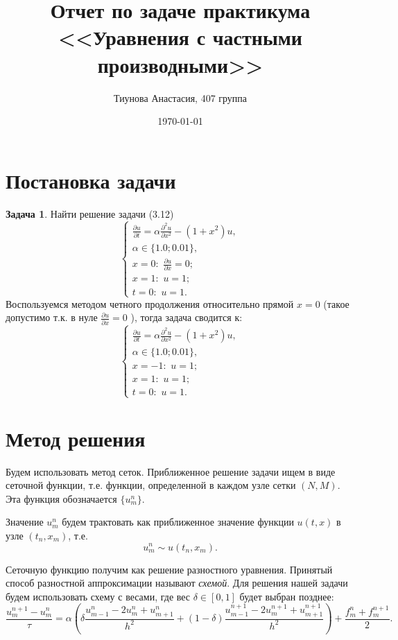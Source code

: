 \documentclass{article}
\title{Отчет по задаче практикума \\ <<Уравнения с частными производными>>}
\date{\today}
\author{Тиунова Анастасия, 407 группа}
\theoremstyle{remark}
\theoremstyle{definition}
\newtheorem*{problem}{Задача}
\begin{document}
	\maketitle
	
	\section{Постановка задачи}
 	\begin{problem} \label{1}
Найти решение задачи (3.12)
$$
\begin{cases}
   \frac{\partial u}{\partial t} =\alpha \frac{\partial^2 u}{\partial x^2} - \left(1+x^2\right)u, \\
   \alpha \in \{1.0; 0.01\},\\
   x=0:\,\,\frac{\partial u}{\partial x}=0;\\
   x=1:\,\, u=1;\\
   t=0:\,\, u=1.
 \end{cases} $$
Воспользуемся методом четного продолжения относительно прямой $x=0$ (такое допустимо т.к. в нуле $\frac{\partial u}{\partial x}=0$ ), тогда задача сводится к:
$$
\begin{cases}
   \frac{\partial u}{\partial t} =\alpha \frac{\partial^2 u}{\partial x^2} - \left(1+x^2\right)u, \\
   \alpha \in \{1.0; 0.01\},\\
   x=-1:\,\,u=1;\\
   x=1:\,\, u=1;\\
   t=0:\,\, u=1.
 \end{cases} $$
\end{problem}

\section{Метод решения}

	Будем использовать метод сеток. Приближенное решение задачи ищем в виде сеточной функции, т.е. функции, определенной в каждом узле сетки $(N,M)$. Эта функция обозначается $\{u^n_m\}$. 
	
	Значение $u^n_m$ будем трактовать как приближенное значение функции $u(t,x)$ в узле $(t_n,x_m)$, т.е. 
	$$
	u^n_m \sim u(t_n,x_m).
	$$
	
	Сеточную функцию получим как решение разностного уравнения. Принятый способ разностной аппроксимации называют \emph{схемой}. Для решения нашей задачи будем использовать схему с весами, где вес  $\delta \in [0,1]$  будет выбран позднее:
	$$
	\boxed{ \frac{u_{m}^{n+1}-u^n_m}{\tau} = \alpha \left(\delta\frac{u^n_{m-1}-2u^n_m + u^n_{m+1}}{h^2}+(1-\delta)\frac{u^{n+1}_{m-1}-2u^{n+1}_m + u^{n+1}_{m+1}}{h^2}\right) + \frac{f^n_m+f^{n+1}_m}{2}}.
	$$
	
\end{document}
